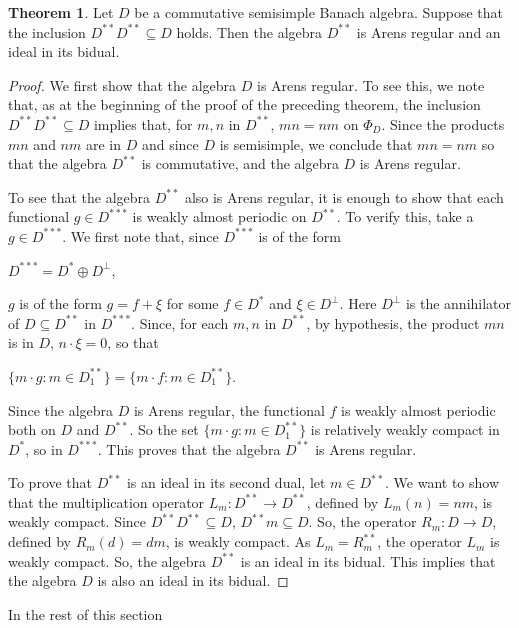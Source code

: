 \documentclass[12pt, twoside, leqno]{article}
\theoremstyle{definition}
\newtheorem{theorem}{Theorem}[section]
\theoremstyle{definition}
\numberwithin{equation}{section}
\begin{document}
\begin{theorem} Let $ D $ be a commutative semisimple Banach algebra. Suppose that the inclusion $ D^{**}D^{**}\subseteq D $ holds. Then the algebra $ D^{**} $ is Arens regular and an ideal in its bidual. 	
\end{theorem} 
\begin{proof}
	We first show that the algebra $ D $ is Arens regular. To see this, we note that, as at the beginning of the proof of the preceding theorem, the inclusion $ D^{**}D^{**}\subseteq D $ implies that, for $ m,n $ in $ D^{**} $, $ mn=nm $ on $ \Phi_{D} $. Since the products $ mn $ and $ nm $ are in $ D $ and since $ D $ is semisimple, we conclude that $mn=nm $ so that the algebra $ D^{**} $ is commutative, and the algebra $ D $ is Arens regular.\vspace{2mm}
	
	To see that the algebra $ D^{**} $ also is Arens regular, it is enough to show that each functional $ g\in D^{***} $ is weakly almost periodic on $ D^{**} $. To verify this, take a $ g\in D^{***} $. We first note that, since $ D^{***} $ is of the form \vspace{3mm}
	
	$ D^{***}=D^{*}\oplus D^{\perp} $, \vspace{3mm}  
	
	\noindent $ g $ is of the form $ g=f+\xi $ for some $ f\in D^{*} $ and $ \xi\in D^{\perp} $. Here $D^{\perp}$ is the annihilator of $D\subseteq D^{**}$ in $D^{***}$. Since, for each $ m,n $ in $ D^{**} $, by hypothesis, the product $ mn $ is in $ D $,  $ n\cdot \xi=0 $, so that \vspace{3mm}
	
	$ \{m\cdot g:m\in D^{**}_{1}\}=\{m\cdot f:m\in D^{**}_{1}\} $. \vspace{3mm} 
	
	\noindent Since the algebra $ D $ is Arens regular, the functional $ f $ is weakly almost periodic both on $ D $ and $ D^{**} $. So the set $ \{m\cdot g:m\in D^{**}_{1}\} $ is relatively weakly compact in $ D^{*} $, so in $ D^{***} $. This proves that the algebra $ D^{**} $ is Arens regular.\vspace{2mm}
	
	To prove that $ D^{**} $ is an ideal in its second dual, let $ m\in D^{**} $. We want to show that the multiplication operator $ L_{m}:D^{**}\rightarrow D^{**} $, defined by $ L_{m}(n)=nm $, is weakly compact. Since $ D^{**}D^{**}\subseteq D $,  $ D^{**}m\subseteq D $. So, the operator $ R_{m}:D\rightarrow D $, defined by $ R_{m}(d)=dm $, is weakly compact. As $ L_{m}=R_{m}^{**} $, the operator $ L_{m} $ is weakly compact. So, the algebra $ D^{**} $ is an ideal in its bidual. This implies that the algebra $ D $ is also an ideal in its bidual.
\end{proof}
In the rest of this section\vspace{2mm} 
\end{document}
